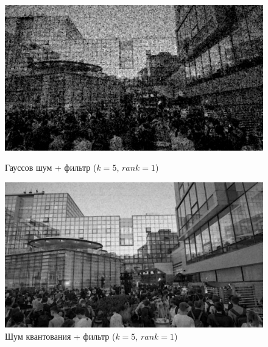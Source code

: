 \documentclass[a4paper]{article}
\begin{document}
\begin{figure}[H]
    \begin{minipage}{0.49\textwidth}
        \centering \includegraphics[width=\textwidth]{images/3_nonlinear_filters/gaussian - rang (k=5, rank=1).jpg}
        \caption{Гауссов шум + фильтр ($k = 5$, $rank = 1$)}
    \end{minipage}\hfill
    \begin{minipage}{0.49\textwidth}
        \centering \includegraphics[width=\textwidth]{images/3_nonlinear_filters/poisson - rang (k=5, rank=1).jpg}
        \caption{Шум квантования + фильтр ($k = 5$, $rank = 1$)}
    \end{minipage}
\end{figure}
\end{document}
